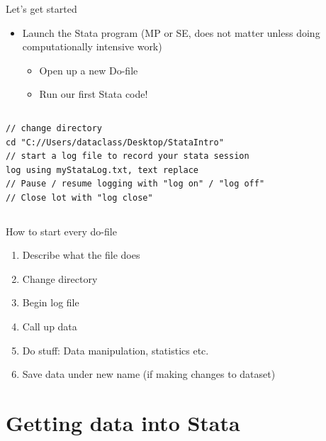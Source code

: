 \documentclass[table,smaller]{beamer}
\begin{document}
\begin{frame}[fragile,label=sec-1-9]{Let's get started}
 \begin{itemize}
\item Launch the Stata program (MP or SE, does not matter unless doing computationally intensive work)
\begin{itemize}
\item Open up a new Do-file
\item Run our first Stata code!
\end{itemize}
\end{itemize}

\vspace{-.5em} \begin{columns}  \begin{block}{}
\begin{verbatim}
// change directory
cd "C://Users/dataclass/Desktop/StataIntro"
// start a log file to record your stata session
log using myStataLog.txt, text replace
// Pause / resume logging with "log on" / "log off"
// Close lot with "log close"
\end{verbatim}
\end{block} \end{columns}
\end{frame}
\begin{frame}[label=sec-1-10]{How to start every do-file}
\begin{enumerate}
\item Describe what the file does
\item Change directory
\item Begin log file
\item Call up data
\item Do stuff: Data manipulation, statistics etc.
\item Save data under new name (if making changes to dataset)
\end{enumerate}
\end{frame}


\section{Getting data into Stata}
\label{sec-2}
\end{document}
